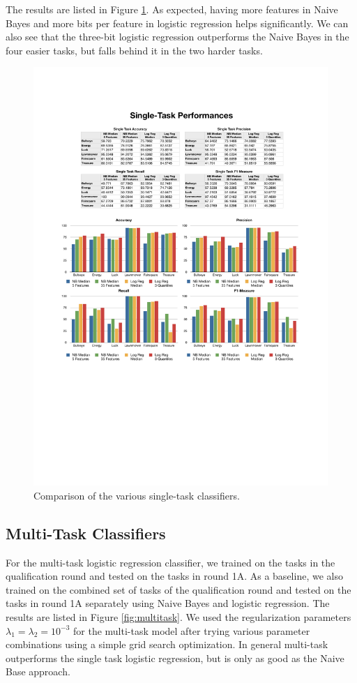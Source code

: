 The results are listed in Figure \ref{fig:singletask}. As expected, having more features in Naive Bayes and more bits per feature in logistic regression helps significantly. We can also see that the three-bit logistic regression outperforms the Naive Bayes in the four easier tasks, but falls behind it in the two harder tasks.

%
\begin{figure}
    \centering
    \setlength{\tabcolsep}{0.0130\linewidth}
    \includegraphics[width=\linewidth]{figures/SingleTask}
    \caption{Comparison of the various single-task classifiers.%
      \label{fig:singletask}}
\end{figure}


\subsection{Multi-Task Classifiers}
For the multi-task logistic regression classifier, we trained on the tasks in the qualification round and tested on the tasks in round 1A. As a baseline, we also trained on the combined set of tasks of the qualification round and tested on the tasks in round 1A separately using Naive Bayes and logistic regression. The results are listed in Figure \ref{fig:multitask}. We used the regularization parameters $\lambda_1 = \lambda_2 = 10^{-3}$ for the multi-task model after trying various parameter combinations using a simple grid search optimization. In general multi-task outperforms the single task logistic regression, but is only as good as the Naive Base approach.


